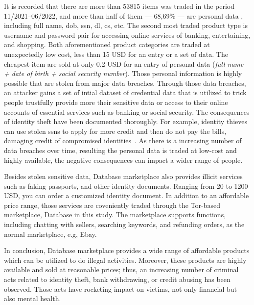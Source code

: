 It is recorded that there are more than 53815 items was traded in the period
11/2021--06/2022, and more than half of them --- 68,69\% --- are personal data
, including full name, \acrlong{dob}, \acrlong{ssn}, \acrlong{dl}, \acrlong{cs},
etc. The second
most traded product type is username and password pair for accessing online
services of banking, entertaining, and shopping. Both aforementioned product
categories are traded at unexpectedly low cost, less than 15 USD for an entry or
a set of data. The cheapest item are sold at only 0.2 USD for an entry of personal
data (\emph{full name + date of birth + social security number}). Those personal
information is highly possible that are stolen from major data breaches. Through
those data breaches, an attacker gains a set of intial dataset of credential data
that is utilized to trick people trustfully provide more their sensitive data or
access to their online accounts of essential services such as banking or social
security. The consequences of identity theft have been documented thoroughly.
For example, identity thieves can use stolen \acrshort{ssn}s to apply for more
credit and then do not pay the bills, damaging credit of compromised identities~\cite{web:identity_theft}.
As there is a increasing number of data breaches over time, resulting the personal
data is traded at low-cost and highly available, the negative consequences can impact
a wider range of people.

Besides stolen sensitive data, Database marketplace also provides illicit services
such as faking passports, and other identity documents. Ranging from 20 to 1200 USD,
you can order a customized identity document. In addition to an affordable price range,
those services are coveniently traded through the Tor-based marketplace, Database in
this study. The marketplace supports functions, including chatting with sellers, 
searching keywords, and refunding orders, as the normal marketplace, e.g, Ebay.

In conclusion, Database marketplace provides a wide range of affordable products which
can be utilized to do illegal activities. Moreover, these products are highly
available and sold at reasonable prices; thus, an increasing number of criminal
acts related to identity theft, bank withdrawing, or credit abusing has been
observed. Those acts have rocketing impact on victims, not only financial but
also mental health.
